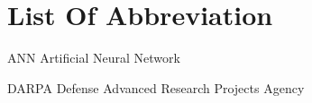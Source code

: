 \section*{List Of Abbreviation}

\newcommand{\abbrlabel}[1]{\makebox[3cm][l]{\textbf{#1}\ \dotfill}}
\newenvironment{abbreviations}{\begin{list}{}{\renewcommand{\makelabel}{\abbrlabel}}}{\end{list}}
\begin{abbreviations}
	\item[ANN] Artificial Neural Network
	\item[DARPA] Defense Advanced Research Projects Agency
\end{abbreviations}
